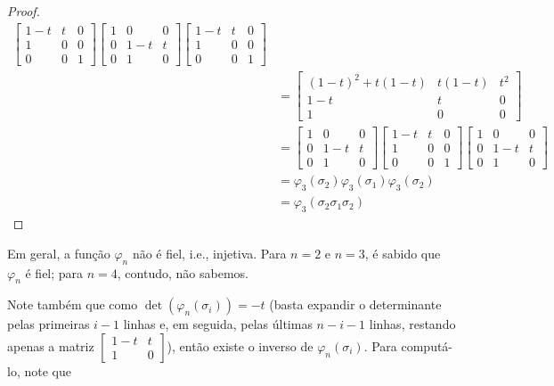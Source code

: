 \begin{proof}
\begin{align*}
\begin{bmatrix}
		1-t & t & 0 \\
		1 & 0 & 0 \\
		0 & 0 & 1
		\end{bmatrix}\begin{bmatrix}
		1 & 0 & 0 \\
		0 & 1-t & t \\
		0 & 1 & 0
		\end{bmatrix}\begin{bmatrix}
		1-t & t & 0 \\
		1 & 0 & 0 \\
		0 & 0 & 1
		\end{bmatrix} \\
		&= \begin{bmatrix}
		(1-t)^2 +t(1-t) & t(1-t) & t^2 \\
		1-t & t & 0 \\
		1 & 0 & 0
		\end{bmatrix} \\
		&= \begin{bmatrix}
		1 & 0 & 0 \\
		0 & 1-t & t \\
		0 & 1 & 0
		\end{bmatrix}\begin{bmatrix}
		1-t & t & 0 \\
		1 & 0 & 0 \\
		0 & 0 & 1
		\end{bmatrix}\begin{bmatrix}
		1 & 0 & 0 \\
		0 & 1-t & t \\
		0 & 1 & 0
		\end{bmatrix}\\
		&= \varphi_3(\sigma_2)\varphi_3(\sigma_1)\varphi_3(\sigma_2)\\
		&=\varphi_3(\sigma_2\sigma_1\sigma_2)
		\end{align*}
	\end{proof}
	\begin{remark}
		Em geral, a função $\varphi_n$ não é fiel, i.e., injetiva. Para $n=2$ e $n=3$, é sabido que $\varphi_n$ é fiel; para $n=4$, contudo, não sabemos.
	\end{remark}
	\par\vspace{0.3cm} Note também que como $\det(\varphi_n(\sigma_i)) = -t$ (basta expandir o determinante pelas primeiras $i-1$ linhas e, em seguida, pelas últimas $n-i-1$ linhas, restando apenas a matriz $\left[\begin{smallmatrix}
	1-t & t \\
	1 & 0
	\end{smallmatrix}\right]$), então existe o inverso de $\varphi_n(\sigma_i)$. Para computá-lo, note que
